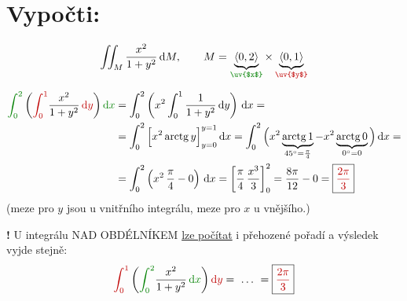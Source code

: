 \documentclass[11pt,a4paper]{article}
\newcommand{\vysl}[1]{\boxed{\color{red!75!black}#1}}
\newcommand{\pozn}[1]{{\color{red!75!black}#1}}
\newcommand{\dx}{\,\mathrm{d}x}
\DeclareMathOperator{\arctg}{arctg}
\newcommand{\dy}{\,\mathrm{d}y}
\begin{document}
\section*{Vypočti:}

\[
\iint_M\frac{x^2}{1+y^2}\,\mathrm{d}M, \qquad M=\underbrace{\langle0,2\rangle}_{\text{\color{green!50!black}\uv{$x$}}}\times\underbrace{\langle0,1\rangle}_{\text{\color{red!75!black}\uv{$y$}}}
\]

\begin{align*}
{\color{green!50!black}\int_0^2}\left({\color{red!75!black}\int_0^1}\frac{x^2}{1+y^2}\,{\color{red!75!black}\mathrm{d}y}\right){\color{green!50!black}\mathrm{d}x}
&= \int_0^2\left(x^2\int_0^1\frac{1}{1+y^2}\dy\right)\dx =\\
&= \int_0^2\Big[x^2\arctg y\Big]_{y=0}^{y=1}\dx
= \int_0^2\Big(x^2\underbrace{\arctg1}_{45^\circ=\frac\pi4}-x^2\underbrace{\arctg0}_{0^\circ=0}\Big)\dx
=\\
&= \int_0^2\left(x^2\,\frac\pi4-0\right)\dx = \left[\frac\pi4\,\frac{x^3}{3}\right]_0^2 = \frac{8\pi}{12}-0 = \vysl{\frac{2\pi}{3}}
\end{align*}
({\color{red!75!black}meze pro $y$} jsou u vnitřního integrálu, {\color{green!50!black}meze pro $x$} u vnějšího.)

\bigskip
\pozn{\textbf{!} U integrálu NAD OBDÉLNÍKEM \underline{lze počítat} i přehozené pořadí a výsledek vyjde stejně:}
\[
{\color{red!75!black}\int_0^1}\left({\color{green!50!black}\int_0^2}\frac{x^2}{1+y^2}\,{\color{green!50!black}\mathrm{d}x}\right){\color{red!75!black}\mathrm{d}y}
= \ \dots\ = \vysl{\frac{2\pi}{3}}
\]
\end{document}
